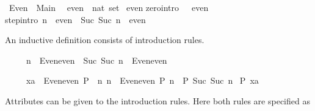 %
\begin{isabellebody}%
\def\isabellecontext{Even}%
\isanewline
{}\ Even\ \ Main\ \isanewline
\isanewline
\isanewline
\isamarkupfalse%
\ even\ {\isacharcolon}{\isacharcolon}\ {\isachardoublequote}nat\ set{\isachardoublequote}\isanewline
\isamarkupfalse%
\ even\isanewline
{}\isanewline
zero{\isacharbrackleft}intro{\isacharbang}{\isacharbrackright}{\isacharcolon}\ {\isachardoublequote}{}\ {\isasymin}\ even{\isachardoublequote}\isanewline
step{\isacharbrackleft}intro{\isacharbang}{\isacharbrackright}{\isacharcolon}\ {\isachardoublequote}n\ {\isasymin}\ even\ {\isasymLongrightarrow}\ {\isacharparenleft}Suc\ {\isacharparenleft}Suc\ n{\isacharparenright}{\isacharparenright}\ {\isasymin}\ even{\isachardoublequote}\isamarkupfalse%
%
\begin{isamarkuptext}%
An inductive definition consists of introduction rules. 

\begin{isabelle}%
\ \ \ \ \ n\ {\isasymin}\ Even{\isachardot}even\ {\isasymLongrightarrow}\ Suc\ {\isacharparenleft}Suc\ n{\isacharparenright}\ {\isasymin}\ Even{\isachardot}even%
\end{isabelle}

\begin{isabelle}%
\ \ \ \ \ {\isasymlbrakk}xa\ {\isasymin}\ Even{\isachardot}even{\isacharsemicolon}\ P\ {}{\isacharsemicolon}\ {\isasymAnd}n{\isachardot}\ {\isasymlbrakk}n\ {\isasymin}\ Even{\isachardot}even{\isacharsemicolon}\ P\ n{\isasymrbrakk}\ {\isasymLongrightarrow}\ P\ {\isacharparenleft}Suc\ {\isacharparenleft}Suc\ n{\isacharparenright}{\isacharparenright}{\isasymrbrakk}\isanewline
\isaindent{\ \ \ \ \ }{\isasymLongrightarrow}\ P\ xa%
\end{isabelle}

Attributes can be given to the introduction rules.  Here both rules are
specified as 


\end{isamarkuptext}
\end{isabellebody}
